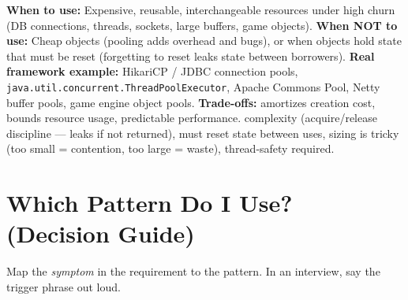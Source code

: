 \documentclass[11pt]{article}
\begin{document}
\textbf{When to use:} Expensive, reusable, interchangeable resources under high churn (DB connections, threads, sockets, large buffers, game objects). \textbf{When NOT to use:} Cheap objects (pooling adds overhead and bugs), or when objects hold state that must be reset (forgetting to reset leaks state between borrowers). \textbf{Real framework example:} HikariCP / JDBC connection pools, \texttt{java.util.concurrent.ThreadPoolExecutor}, Apache Commons Pool, Netty buffer pools, game engine object pools. \textbf{Trade-offs:} amortizes creation cost, bounds resource usage, predictable performance. complexity (acquire/release discipline --- leaks if not returned), must reset state between uses, sizing is tricky (too small = contention, too large = waste), thread-safety required.

\section{Which Pattern Do I Use? (Decision Guide)}\label{which-pattern-do-i-use-decision-guide}

Map the \emph{symptom} in the requirement to the pattern. In an interview, say the trigger phrase out loud.
\end{document}
